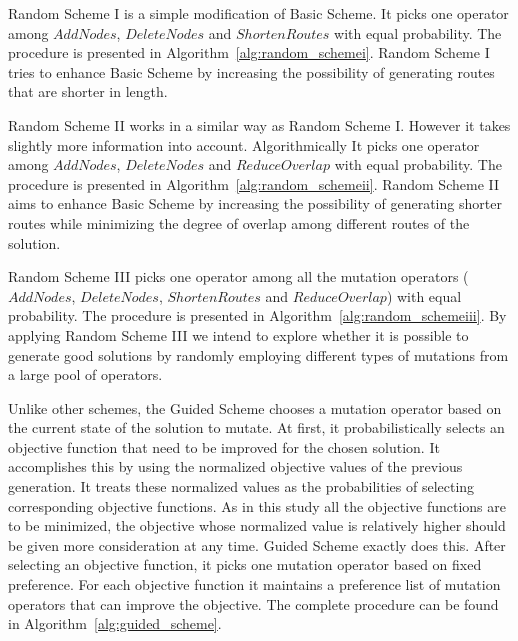 Random Scheme I is a simple modification of Basic Scheme. It picks one operator among $AddNodes$, $DeleteNodes$ and $ShortenRoutes$ with equal probability. The procedure is presented in Algorithm~\ref{alg:random_schemei}. Random Scheme I tries to enhance Basic Scheme by increasing the possibility of generating routes that are shorter in length.

Random Scheme II works in a similar way as Random Scheme I. However it takes slightly more information into account. Algorithmically It picks one operator among $AddNodes$, $DeleteNodes$ and $ReduceOverlap$ with equal probability. The procedure is presented in Algorithm~\ref{alg:random_schemeii}. Random Scheme II aims to enhance Basic Scheme by increasing the possibility of generating shorter routes while minimizing the degree of overlap among different routes of the solution.

Random Scheme III picks one operator among all the mutation operators ($AddNodes$, $DeleteNodes$, $ShortenRoutes$ and $ReduceOverlap$) with equal probability. The procedure is presented in Algorithm~\ref{alg:random_schemeiii}. By applying Random Scheme III we intend to explore whether it is possible to generate good solutions by randomly employing different types of mutations from a large pool of operators.

Unlike other schemes, the Guided Scheme chooses a mutation operator based on the current state of the solution to mutate. At first, it probabilistically selects an objective function that need to be improved for the chosen solution. It accomplishes this by using the normalized objective values of the previous generation. It treats these normalized values as the probabilities of selecting corresponding objective functions. As in this study all the objective functions are to be minimized, the objective whose normalized value is relatively higher should be given more consideration at any time.  Guided Scheme exactly does this. After selecting an objective function, it picks one mutation operator based on fixed preference. For each objective function it maintains a preference list of mutation operators that can improve the objective. The complete procedure can be found in Algorithm~\ref{alg:guided_scheme}.


